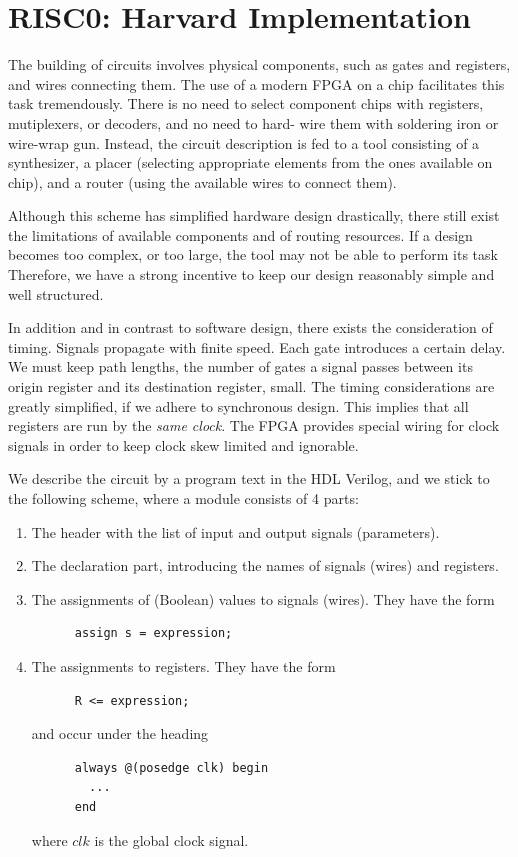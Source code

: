 \section{RISC0: Harvard Implementation}
\label{ch:harvard}
The building of circuits involves physical components, such as gates and registers, and wires
connecting them. The use of a modern FPGA on a chip facilitates this task tremendously. There is
no need to select component chips with registers, mutiplexers, or decoders, and no need to hard-
wire them with soldering iron or wire-wrap gun. Instead, the circuit description is fed to a tool
consisting of a synthesizer, a placer (selecting appropriate elements from the ones available on
chip), and a router (using the available wires to connect them).

Although this scheme has simplified hardware design drastically, there still exist the limitations of
available components and of routing resources. If a design becomes too complex, or too large, the
tool may not be able to perform its task Therefore, we have a strong incentive to keep our design
reasonably simple and well structured.

In addition and in contrast to software design, there exists the consideration of timing. Signals
propagate with finite speed. Each gate introduces a certain delay. We must keep path lengths, the
number of gates a signal passes between its origin register and its destination register, small. The
timing considerations are greatly simplified, if we adhere to synchronous design. This implies that all
registers are run by the \emph{same clock}. The FPGA provides special wiring for clock signals in
order to keep clock skew limited and ignorable.

We describe the circuit by a program text in the HDL Verilog, and we stick to the following scheme,
where a module consists of 4 parts:
\begin{enumerate}
  \item The header with the list of input and output signals (parameters).
  \item The declaration part, introducing the names of signals (wires) and registers.
  \item The assignments of (Boolean) values to signals (wires). They have the form
    \begin{verbatim}
      assign s = expression;
    \end{verbatim}
  \item The assignments to registers. They have the form
    \begin{verbatim}
      R <= expression;
    \end{verbatim}
    and occur under the heading
    \begin{verbatim}
      always @(posedge clk) begin
        ...
      end
    \end{verbatim}
    where $clk$ is the global clock signal.
\end{enumerate}

